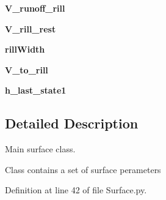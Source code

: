 \begin{DoxyCompactItemize}
\item 
\hypertarget{classsmoderp2d_1_1src_1_1main__classes_1_1Surface_1_1SurArrs_a4694f9abfba295f68a313407b61894dc}{{\bfseries V\-\_\-runoff\-\_\-rill}}\label{classsmoderp2d_1_1src_1_1main__classes_1_1Surface_1_1SurArrs_a4694f9abfba295f68a313407b61894dc}

\item 
\hypertarget{classsmoderp2d_1_1src_1_1main__classes_1_1Surface_1_1SurArrs_a4fd51b130216b239e3b56afe85d984e7}{{\bfseries V\-\_\-rill\-\_\-rest}}\label{classsmoderp2d_1_1src_1_1main__classes_1_1Surface_1_1SurArrs_a4fd51b130216b239e3b56afe85d984e7}

\item 
\hypertarget{classsmoderp2d_1_1src_1_1main__classes_1_1Surface_1_1SurArrs_aa26b1528adae60c9964db0b02ed5ebd2}{{\bfseries rill\-Width}}\label{classsmoderp2d_1_1src_1_1main__classes_1_1Surface_1_1SurArrs_aa26b1528adae60c9964db0b02ed5ebd2}

\item 
\hypertarget{classsmoderp2d_1_1src_1_1main__classes_1_1Surface_1_1SurArrs_a8e9091c6dba8d972439069d549db61ff}{{\bfseries V\-\_\-to\-\_\-rill}}\label{classsmoderp2d_1_1src_1_1main__classes_1_1Surface_1_1SurArrs_a8e9091c6dba8d972439069d549db61ff}

\item 
\hypertarget{classsmoderp2d_1_1src_1_1main__classes_1_1Surface_1_1SurArrs_a80b8f31208066d10c7a605af36def0e8}{{\bfseries h\-\_\-last\-\_\-state1}}\label{classsmoderp2d_1_1src_1_1main__classes_1_1Surface_1_1SurArrs_a80b8f31208066d10c7a605af36def0e8}

\end{DoxyCompactItemize}


\subsection{Detailed Description}
Main surface class. 

Class contains a set of surface perameters 

Definition at line 42 of file Surface.\-py.



